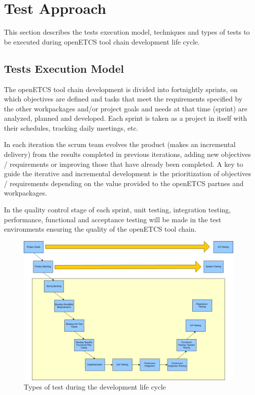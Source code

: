 \section{Test Approach}
\label{sec:test_stra}

This section describes the tests execution model, techniques and types of tests to be executed during openETCS tool chain development life cycle.

\subsection{Tests Execution Model}
The openETCS tool chain development is divided into  fortnightly sprints, on which objectives are defined and tasks that meet the requirements specified by the other workpackages and/or project goals and needs at that time (sprint) are analyzed, planned and developed. Each sprint is taken as a project in itself with their schedules, tracking daily meetings, etc.

In each iteration the scrum team evolves the product (makes an incremental delivery) from the results completed in previous iterations, adding new objectives / requirements or improving those that have already been completed. A key to guide the iterative and incremental development is the prioritization of objectives / requirements depending on the value provided to the openETCS partnes and workpackages.

In the quality control stage of each sprint, unit testing, integration testing, performance, functional and acceptance testing will be made in the test environments ensuring the quality of the openETCS tool chain.

\begin{figure}[htbp]
\includegraphics[width=\textwidth]{types_test}
\caption{\label{fig:types} Types of test during the development life cycle} 
\end{figure}


